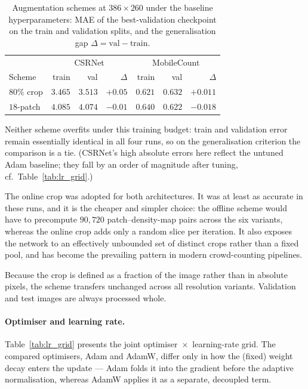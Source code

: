 \documentclass[conference]{IEEEtran}
\begin{document}
\begin{table}[t]
    \centering
    \caption{Augmentation schemes at $386\times260$ under the baseline
    hyperparameters: MAE of the best-validation checkpoint on the train
    and validation splits, and the generalisation gap
    $\Delta = \text{val} - \text{train}$.}
    \label{tab:aug_paper_schemes}
    \small
    \begin{tabular}{l rrrrrr}
        \toprule
        & \multicolumn{3}{c}{CSRNet}& \multicolumn{3}{c}{MobileCount}\\

        Scheme& train & val & $\Delta$ & train & val & $\Delta$ \\
        \midrule
        $80\%$ crop& $3.465$ & $3.513$ & $+0.05$ & $0.621$ & $0.632$ & $+0.011$ \\
        $18$-patch& $4.085$ & $4.074$ & $-0.01$ & $0.640$ & $0.622$ & $-0.018$ \\
        \bottomrule
    \end{tabular}
\end{table}

Neither scheme overfits under this training budget: train and validation
error remain essentially identical in all four runs, so on the
generalisation criterion the comparison is a tie. (CSRNet's high absolute
errors here reflect the untuned Adam baseline; they fall by an order of
magnitude after tuning, cf.\ Table~\ref{tab:lr_grid}.)

The online crop was adopted for both architectures. It was at least as accurate in these runs, and it is the cheaper and simpler choice: the offline scheme would have to precompute $90{,}720$ patch--density-map pairs across the six variants, whereas the online crop adds
only a random slice per iteration. It also exposes the network to an
effectively unbounded set of distinct crops rather than a fixed pool,
and has become the prevailing pattern in modern crowd-counting
pipelines.

Because the crop is defined as a fraction of the image rather than in
absolute pixels, the scheme transfers unchanged across all resolution
variants. Validation and test images are always processed whole.

\paragraph{Optimiser and learning rate.}
Table~\ref{tab:lr_grid} presents the joint optimiser~$\times$~learning-rate grid. The compared optimisers, Adam and AdamW, differ only in how the (fixed) weight decay enters the update — Adam folds it into the
gradient before the adaptive normalisation, whereas AdamW applies it
as a separate, decoupled term.
\end{document}
